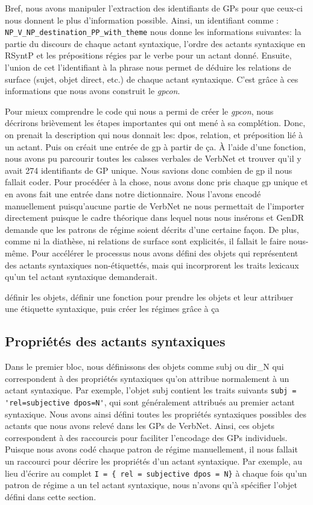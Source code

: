 Bref, nous avons manipuler l'extraction des identifiants de \acp{GP} pour que ceux-ci nous donnent le plus d'information possible. Ainsi, un identifiant comme : \texttt{NP\_V\_NP\_destination\_PP\_with\_theme} nous donne les informations suivantes: la partie du discours de chaque actant syntaxique, l'ordre des actants syntaxique en \ac{RSyntP} et les prépositions régies par le verbe pour un actant donné. Ensuite, l'union de cet l'identifiant à la phrase  nous permet de déduire les relations de surface (sujet, objet direct, etc.) de chaque actant syntaxique. C'est grâce à ces informations que nous avons construit le \emph{gpcon}.

Pour mieux comprendre le code qui nous a permi de créer le \emph{gpcon}, nous décrirons brièvement les étapes importantes qui ont mené à sa complétion. Donc, on prenait la description qui nous donnait les: dpos, relation, et préposition lié à un actant. Puis on créait une entrée de gp à partir de ça. À l'aide d'une fonction, nous avons pu parcourir toutes les calsses verbales de VerbNet et trouver qu'il y avait 274 identifiants de GP unique. Nous savions donc combien de gp il nous fallait coder. Pour procédéer à la chose, nous avons donc pris chaque gp unique et en avons fait une entrée dans notre dictionnaire. Nous l'avons encodé manuellement puisqu'aucune partie de VerbNet ne nous permettait de l'importer directement puisque le cadre théorique dans lequel nous nous insérons et GenDR demande que les patrons de régime soient décrits d'une certaine façon. De plus, comme ni la diathèse, ni relations de surface sont explicités, il fallait le faire nous-même. Pour accélérer le processus nous avons défini des objets qui représentent des actants syntaxiques non-étiquettés, mais qui incorprorent les traits lexicaux qu'un tel actant syntaxique demanderait.

{définir les objets, définir une fonction pour prendre les objets et leur attribuer une étiquette syntaxique, puis créer les régimes grâce à ça}

\subsection{Propriétés des actants syntaxiques}

Dans le premier bloc, nous définissons des objets comme subj ou dir\_N qui correspondent à des propriétés syntaxiques qu'on attribue normalement à un actant syntaxique. Par exemple, l'objet subj contient les traits suivants \lstinline|subj = 'rel=subjective dpos=N'|, qui sont généralement attribués au premier actant syntaxique. Nous avons ainsi défini toutes les propriétés syntaxiques possibles des actants que nous avons relevé dans les \acp{GP} de VerbNet. Ainsi, ces objets correspondent à des raccourcis pour faciliter l'encodage des \acp{GP} individuels. Puisque nous avons codé chaque patron de régime manuellement, il nous fallait un raccourci pour décrire les propriétés d'un actant syntaxique. Par exemple, au lieu d'écrire au complet \lstinline|I = { rel = subjective dpos = N}| à chaque fois qu'un patron de régime a un tel actant syntaxique, nous n'avons qu'à spécifier l'objet défini dans cette section. 

